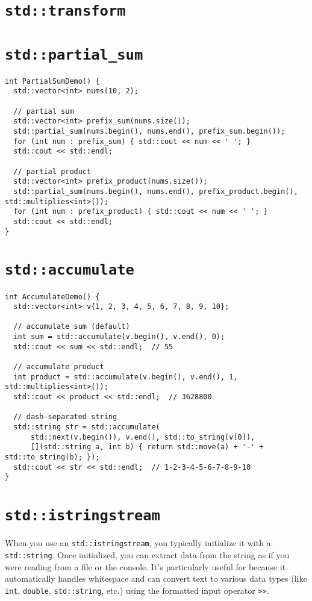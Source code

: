 \section{{\colorbox{CodeBackground}{\lstinline|std::transform|}}}
\section{{\colorbox{CodeBackground}{\lstinline|std::partial_sum|}}}
\begin{lstlisting}
int PartialSumDemo() {
  std::vector<int> nums(10, 2);

  // partial sum
  std::vector<int> prefix_sum(nums.size());
  std::partial_sum(nums.begin(), nums.end(), prefix_sum.begin());
  for (int num : prefix_sum) { std::cout << num << ' '; }
  std::cout << std::endl;

  // partial product
  std::vector<int> prefix_product(nums.size());
  std::partial_sum(nums.begin(), nums.end(), prefix_product.begin(), std::multiplies<int>());
  for (int num : prefix_product) { std::cout << num << ' '; }
  std::cout << std::endl;
}
\end{lstlisting}
\section{{\colorbox{CodeBackground}{\lstinline|std::accumulate|}}}
\begin{lstlisting}
int AccumulateDemo() {
  std::vector<int> v{1, 2, 3, 4, 5, 6, 7, 8, 9, 10};

  // accumulate sum (default)
  int sum = std::accumulate(v.begin(), v.end(), 0);
  std::cout << sum << std::endl;  // 55

  // accumulate product
  int product = std::accumulate(v.begin(), v.end(), 1, std::multiplies<int>());
  std::cout << product << std::endl;  // 3628800

  // dash-separated string
  std::string str = std::accumulate(
      std::next(v.begin()), v.end(), std::to_string(v[0]),
      [](std::string a, int b) { return std::move(a) + '-' + std::to_string(b); });
  std::cout << str << std::endl;  // 1-2-3-4-5-6-7-8-9-10
}
\end{lstlisting}

\section{{\colorbox{CodeBackground}{\lstinline|std::istringstream|}}}
When you use an {\colorbox{CodeBackground}{\lstinline|std::istringstream|}}, you typically initialize it with a {\colorbox{CodeBackground}{\lstinline|std::string|}}. Once initialized, you can extract data from the string as if you were reading from a file or the console. It's particularly useful for {\color{blue}{parsing and tokenizing strings}} because it automatically handles whitespace and can convert text to various data types (like {\colorbox{CodeBackground}{\lstinline|int|}}, {\colorbox{CodeBackground}{\lstinline|double|}}, {\colorbox{CodeBackground}{\lstinline|std::string|}}, etc.) using the formatted input operator {\colorbox{CodeBackground}{\lstinline|>>|}}.\\

